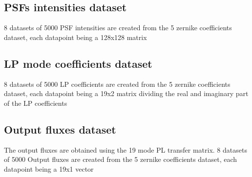 	\subsection{PSFs intensities dataset}
		8 datasets of 5000 PSF intensities are created from the 5 zernike coefficients dataset, each datapoint being a 128x128 matrix
		
	\subsection{LP mode coefficients dataset}
		8 datasets of 5000 LP coefficients are created from the 5 zernike coefficients dataset, each datapoint being a 19x2 matrix dividing the real and imaginary part of the LP coefficients
		
	\subsection{Output fluxes dataset}
		The output fluxes are obtained using the 19 mode PL transfer matrix.
		8 datasets of 5000 Output fluxes are created from the 5 zernike coefficients dataset, each datapoint being a 19x1 vector
		